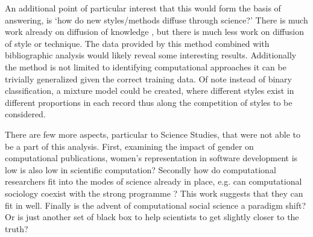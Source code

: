 \documentclass[12pt, a4paper]{article}
\begin{document}
An additional point of particular interest that this would form the basis of answering, is `how do new styles/methods diffuse through science?' There is much work already on diffusion of knowledge \citep{griliches1960hybrid} \citep{crane1972invisible} \citep{evans2010industry}, but there is much less work on diffusion of style or technique. The data provided by this method combined with bibliographic analysis would likely reveal some interesting results. Additionally the method is not limited to identifying computational approaches it can be trivially generalized given the correct training data. Of note instead of binary classification, a mixture model could be created, where different styles exist in different proportions in each record thus along the competition of styles to be considered.

There are few more aspects, particular to Science Studies, that were not able to be a part of this analysis. First, examining the impact of gender on computational publications, women's representation in software development is low is also low in scientific computation? Secondly how do computational researchers fit into the modes of science already in place, e.g. can computational sociology coexist with the strong programme \citep{bloor1976strong}? This work suggests that they can fit in well. Finally is the advent of computational social science a paradigm shift? Or is just another set of black box to help scientists to get slightly closer to the truth?

\newpage
\singlespacing
\setcounter{page}{1}
{}




\appendix
\end{document}
